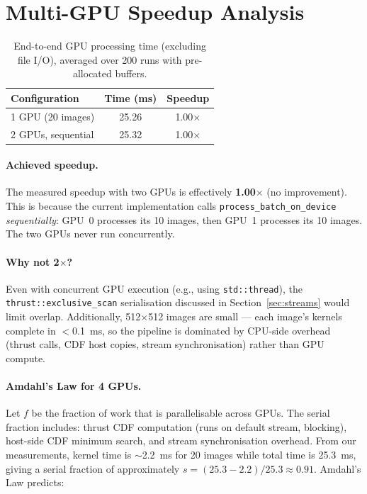 \documentclass[
hf,
]{confart}
\begin{document}
\section{Multi-GPU Speedup Analysis}
\label{sec:multigpu}

\begin{table}[htbp]
\centering
\renewcommand{\arraystretch}{1.1}
\begin{tabular}{lcc}
\toprule
\textbf{Configuration} & \textbf{Time (ms)} & \textbf{Speedup} \\
\midrule
1 GPU (20 images)  & 25.26 & 1.00$\times$ \\
2 GPUs, sequential & 25.32 & 1.00$\times$ \\
\bottomrule
\end{tabular}
\caption{End-to-end GPU processing time (excluding file I/O), averaged over 200 runs with pre-allocated buffers.}
\label{tab:multigpu}
\end{table}

\paragraph{Achieved speedup.}
The measured speedup with two GPUs is effectively \textbf{1.00$\times$} (no improvement). This is because the current implementation calls \texttt{process\_batch\_on\_device} \emph{sequentially}: GPU~0 processes its 10 images, then GPU~1 processes its 10 images. The two GPUs never run concurrently.

\paragraph{Why not 2$\times$?}
Even with concurrent GPU execution (e.g., using \texttt{std::thread}), the \texttt{thrust::exclusive\_scan} serialisation discussed in Section~\ref{sec:streams} would limit overlap. Additionally, 512$\times$512 images are small — each image's kernels complete in $<$0.1~ms, so the pipeline is dominated by CPU-side overhead (thrust calls, CDF host copies, stream synchronisation) rather than GPU compute.

\paragraph{Amdahl's Law for 4 GPUs.}
Let $f$ be the fraction of work that is parallelisable across GPUs. The serial fraction includes: thrust CDF computation (runs on default stream, blocking), host-side CDF minimum search, and stream synchronisation overhead. From our measurements, kernel time is $\sim$2.2~ms for 20 images while total time is 25.3~ms, giving a serial fraction of approximately $s = (25.3 - 2.2)/25.3 \approx 0.91$. Amdahl's Law predicts:
\end{document}
